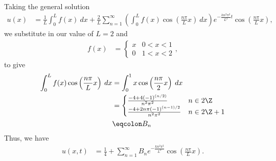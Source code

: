 \documentclass[10pt]{mypackage}
\begin{document}
\begin{solution}[12.3, Problem 4]
  Taking the general solution
  \begin{align*}
    u(x) &= \frac{1}{L} \int_{0}^{L} f(x)\:dx + \frac{2}{L} \sum_{n=1}^{\infty} \left( \int_{0}^{L} f(x)\cos\left( \frac{n\pi}{L}x \right)\:dx \right)e^{-\frac{kn^2\pi^2}{L^2}t} \cos\left( \frac{n\pi}{L}x \right),
  \end{align*}
  we substitute in our value of $L = 2$ and 
  \begin{align*}
    f(x) &= \begin{cases}
      x & 0 < x < 1\\
      0 & 1 < x < 2
    \end{cases},
  \end{align*}
  to give
  \begin{align*}
    \int_{0}^{L} f(x)\cos\left( \frac{n\pi}{L}x \right)\:dx &= \int_{0}^{1} x\cos\left( \frac{n\pi}{2}x \right)\:dx\\
                                                            &= \begin{cases}
                                                              \frac{-4 + 4\left( -1 \right)^{(n/2)}}{n^2\pi^2} & n\in2\Z\\
                                                              \frac{-4 + 2n\pi\left( -1 \right)^{(n-1)/2}}{n^2\pi^2} & n\in2\Z + 1
                                                            \end{cases}\\
                                                            &\eqcolon B_n
  \end{align*}
  Thus, we have
  \begin{align*}
    u\left( x,t \right) &= \frac{1}{4} + \sum_{n=1}^{\infty} B_ne^{-\frac{kn^2\pi^2}{L^2}}\cos\left( \frac{n\pi}{L}x \right).
  \end{align*}
\end{solution}
\end{document}
